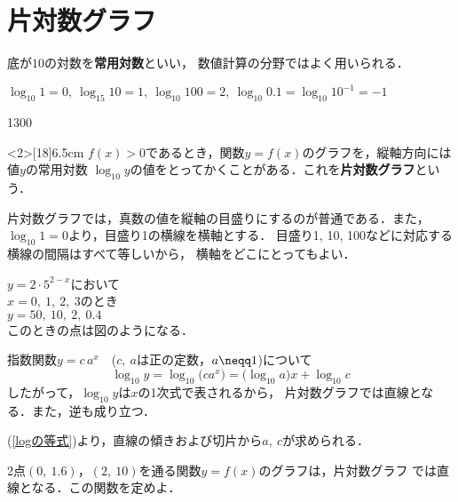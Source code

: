 \documentclass{b5-kaku}
\begin{document}
\setcounter{chapter}{1}

\section*{片対数グラフ}

底が$10$の対数を{\bf 常用対数}といい，
数値計算の分野ではよく用いられる．

\begin{example}
$\log_{10} 1=0,\ \log_{15} 10=1,\ \log_{10}100 =2,\ %
\log_{10}0.1 =\log_{10}10^{-1}=-1$
\end{example}

\begin{layer}{130}{0}
\end{layer}

\begin{mawarikomi}<2>[18]{6.5cm}{}
$f(x)>0$であるとき，関数$y=f(x)$のグラフを，縦軸方向には値$y$の常用対数
$\log_{10}y$の値をとってかくことがある．これを{\bf 片対数グラフ}という．

片対数グラフでは，真数の値を縦軸の目盛りにするのが普通である．また，
$\log_{10} 1=0$より，目盛り1の横線を横軸とする．
目盛り1, 10, 100などに対応する横線の間隔はすべて等しいから，
横軸をどこにとってもよい．
\begin{example}
$y=2\cdot 5^{2-x}$において\\
\hspace*{1zw}$x=0,\ 1,\ 2,\ 3$のとき\\
\hspace*{3zw}$y=50,\ 10,\ 2,\ 0.4$\\
このときの点は図のようになる．
\end{example}

\end{mawarikomi}

指数関数$y=c\,a^x$\ \ ($c,\ a$は正の定数，$a\neqq 1$)について
\begin{equation}\label{logの等式}
\log_{10}y=\log_{10}\bigl(c a^x\bigr)=\bigl(\log_{10}a\bigr)x+\log_{10}c
\end{equation}
したがって，$\log_{10} y$は$x$の1次式で表されるから，
片対数グラフでは直線となる．また，逆も成り立つ．

(\ref{logの等式})より，直線の傾きおよび切片から$a,\ c$が求められる．

\begin{exercise}
2点$(0,\ 1.6)$，$(2,\ 10)$を通る関数$y=f(x)$のグラフは，片対数グラフ
では直線となる．この関数を定めよ．
\end{exercise}
\end{document}
